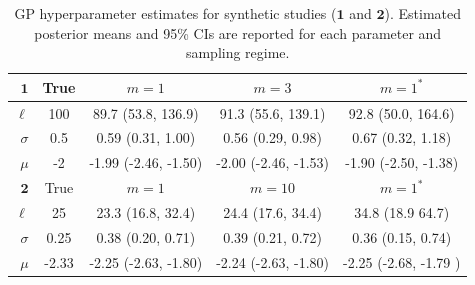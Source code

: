 \documentclass{article}
\begin{document}
\begin{table}[h!]
\caption{GP hyperparameter estimates for synthetic studies ($\mathbf{1}$ and $\mathbf{2}$). Estimated posterior means and 95\% CIs are reported for each parameter and sampling regime.} \centering
\begin{tabular}{ r | c | c c c } \toprule
$\mathbf{1}$ & True & $m=1$ &   $m=3$ &  $m=1^*$\\
\midrule
$\ell$ & 100 & 89.7 (53.8, 136.9)  & 91.3 (55.6, 139.1) & 92.8 (50.0, 164.6)  \\
$\sigma$ & 0.5 & 0.59 (0.31, 1.00) & 0.56 (0.29, 0.98) & 0.67 (0.32, 1.18) \\
$\mu$ & -2 & -1.99 (-2.46,  -1.50) & -2.00 (-2.46, -1.53) & -1.90 (-2.50, -1.38) \\
\hline 
\hline
$\mathbf{2}$ & True & $m=1$ &   $m=10$ &  $m=1^*$\\
\midrule
$\ell$ & 25 & 23.3 (16.8, 32.4)  & 24.4 (17.6, 34.4) & 34.8 (18.9 64.7)  \\
$\sigma$ & 0.25 & 0.38 (0.20,  0.71) & 0.39 (0.21, 0.72) & 0.36 (0.15,  0.74) \\
$\mu$ & -2.33 & -2.25 (-2.63, -1.80) & -2.24 (-2.63, -1.80) & -2.25 (-2.68, -1.79 ) \\ \bottomrule
\end{tabular}
\label{t12}
\end{table}
\end{document}
